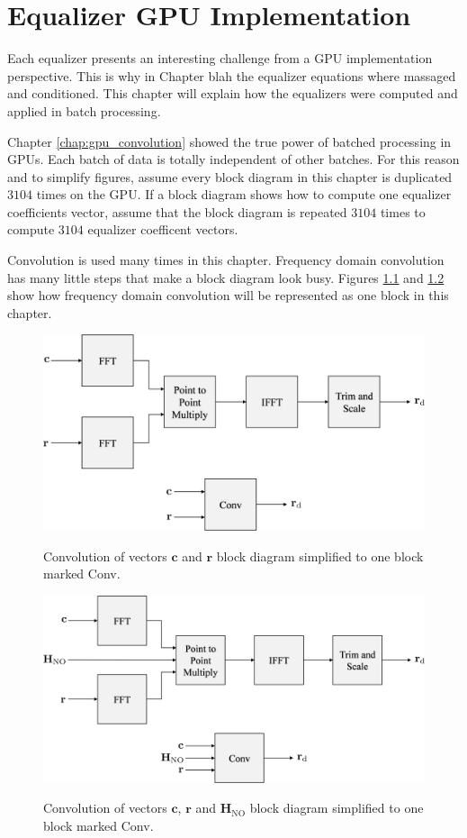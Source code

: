 \chapter{Equalizer GPU Implementation}
\label{chap:equalizers_in_gpus}
Each equalizer presents an interesting challenge from a GPU implementation perspective.
This is why in Chapter blah the equalizer equations where massaged and conditioned.
This chapter will explain how the equalizers were computed and applied in batch processing.

Chapter \ref{chap:gpu_convolution} showed the true power of batched processing in GPUs.
Each batch of data is totally independent of other batches.
For this reason and to simplify figures, assume every block diagram in this chapter is duplicated $3104$ times on the GPU.
If a block diagram shows how to compute one equalizer coefficients vector, assume that the block diagram is repeated $3104$ times to compute $3104$ equalizer coefficent vectors.

Convolution is used many times in this chapter.
Frequency domain convolution has many little steps that make a block diagram look busy.
Figures \ref{fig:Conv2} and \ref{fig:Conv3} show how frequency domain convolution will be represented as one block in this chapter.
\begin{figure}
	\centering\includegraphics[width=9.27in/100*55]{figures/gpu_convolution/Conv2.pdf}
	\label{fig:Conv2}
	\caption{Convolution of vectors $\mathbf{c}$ and $\mathbf{r}$ block diagram simplified to one block marked Conv.}
\end{figure}
\begin{figure}
	\centering\includegraphics[width=9.27in/100*55]{figures/gpu_convolution/Conv3.pdf}
	\label{fig:Conv3}
	\caption{Convolution of vectors $\mathbf{c}$, $\mathbf{r}$ and $\mathbf{H}_{\text{NO}}$ block diagram simplified to one block marked Conv.}
\end{figure}


